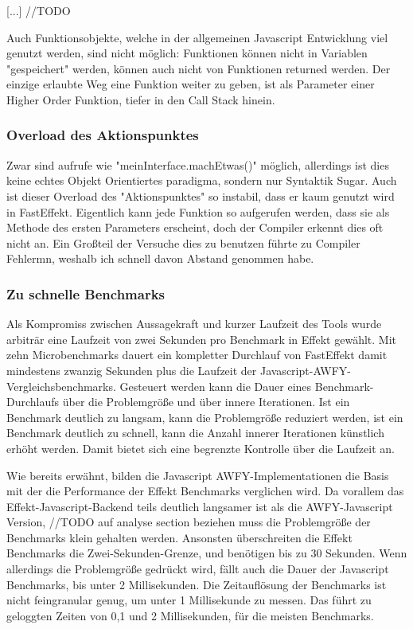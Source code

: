 [...] //TODO


Auch Funktionsobjekte, welche in der allgemeinen Javascript Entwicklung viel genutzt werden, sind nicht möglich: Funktionen können nicht in Variablen "gespeichert" werden, können auch nicht von Funktionen returned werden.
Der einzige erlaubte Weg eine Funktion weiter zu geben, ist als Parameter einer Higher Order Funktion, tiefer in den Call Stack hinein.




\subsubsection{ Overload des Aktionspunktes }
Zwar sind aufrufe wie "meinInterface.machEtwas()" möglich, allerdings ist dies keine echtes Objekt Orientiertes paradigma, sondern nur Syntaktik Sugar.
Auch ist dieser Overload des "Aktionspunktes" so instabil, dass er kaum genutzt wird in FastEffekt. Eigentlich kann jede Funktion so aufgerufen werden, dass sie als Methode des ersten Parameters erscheint, 
doch der Compiler erkennt dies oft nicht an. Ein Großteil der Versuche dies zu benutzen führte zu Compiler Fehlermn, weshalb ich schnell davon Abstand genommen habe.

\subsubsection{ Zu schnelle Benchmarks }
Als Kompromiss zwischen Aussagekraft und kurzer Laufzeit des Tools wurde arbiträr eine Laufzeit von zwei Sekunden pro Benchmark in Effekt gewählt.
Mit zehn Microbenchmarks dauert ein kompletter Durchlauf von FastEffekt damit mindestens zwanzig Sekunden plus die Laufzeit der Javascript-AWFY-Vergleichsbenchmarks.
Gesteuert werden kann die Dauer eines Benchmark-Durchlaufs über die Problemgröße und über innere Iterationen. Ist ein Benchmark deutlich zu langsam, kann die Problemgröße reduziert werden, ist ein Benchmark deutlich zu schnell, kann die Anzahl innerer Iterationen künstlich erhöht werden. Damit bietet sich eine begrenzte Kontrolle über die Laufzeit an.

Wie bereits erwähnt, bilden die Javascript AWFY-Implementationen die Basis mit der die Performance der Effekt Benchmarks verglichen wird.
Da vorallem das Effekt-Javascript-Backend teils deutlich langsamer ist als die AWFY-Javascript Version, //TODO auf analyse section beziehen
 muss die Problemgröße der Benchmarks klein gehalten werden. Ansonsten überschreiten die Effekt Benchmarks die Zwei-Sekunden-Grenze, und benötigen bis zu 30 Sekunden. Wenn allerdings die Problemgröße gedrückt wird, fällt auch die Dauer der Javascript Benchmarks, bis unter 2 Millisekunden. Die Zeitauflösung der Benchmarks ist nicht feingranular genug, um unter 1 Millisekunde zu messen. Das führt zu geloggten Zeiten von 0,1 und 2 Millisekunden, für die meisten Benchmarks. 

